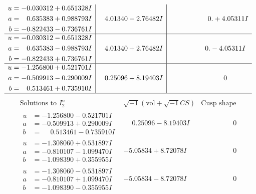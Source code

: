 \documentclass[1p]{elsarticle_modified}
\theoremstyle{definition}
\newcommand{\I}{\sqrt{-1}}
\begin{document}
$$\begin{array}{c|c|c}
\begin{aligned}
u &= -0.030312 + 0.651328 I \\
a &= \phantom{-}0.635383 + 0.988793 I \\
b &= -0.822433 - 0.736761 I\end{aligned}
 & \phantom{-}4.01340 - 2.76482 I & \phantom{-0.000000 -}0. + 4.05311 I \\ \hline\begin{aligned}
u &= -0.030312 - 0.651328 I \\
a &= \phantom{-}0.635383 - 0.988793 I \\
b &= -0.822433 + 0.736761 I\end{aligned}
 & \phantom{-}4.01340 + 2.76482 I & \phantom{-0.000000 } 0. - 4.05311 I \\ \hline\begin{aligned}
u &= -1.256800 + 0.521701 I \\
a &= -0.509913 - 0.290009 I \\
b &= \phantom{-}0.513461 + 0.735910 I\end{aligned}
 & \phantom{-}0.25096 + 8.19403 I & \phantom{-0.000000 } 0\\
 \hline 
 \end{array}$$\newpage$$\begin{array}{c|c|c}  
\text{Solutions to }I^u_{2}& \I (\text{vol} + \sqrt{-1}CS) & \text{Cusp shape}\\
 \hline 
\begin{aligned}
u &= -1.256800 - 0.521701 I \\
a &= -0.509913 + 0.290009 I \\
b &= \phantom{-}0.513461 - 0.735910 I\end{aligned}
 & \phantom{-}0.25096 - 8.19403 I & \phantom{-0.000000 } 0 \\ \hline\begin{aligned}
u &= -1.308060 + 0.531897 I \\
a &= -0.810107 - 1.099470 I \\
b &= -1.098390 + 0.355955 I\end{aligned}
 & -5.05834 + 8.72078 I & \phantom{-0.000000 } 0 \\ \hline\begin{aligned}
u &= -1.308060 - 0.531897 I \\
a &= -0.810107 + 1.099470 I \\
b &= -1.098390 - 0.355955 I\end{aligned}
 & -5.05834 - 8.72078 I & \phantom{-0.000000 } 0 \\ \hline\begin{aligned}

\end{aligned}
\end{array}$$
\end{document}
